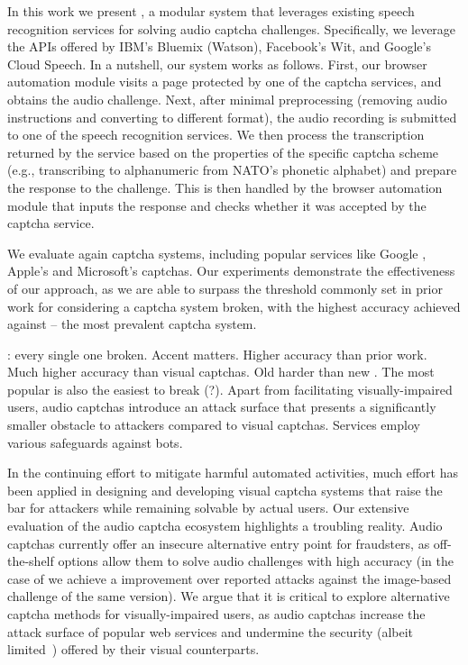 In this work we present \system, a modular system that leverages existing speech recognition services
for solving audio captcha challenges. Specifically, we leverage the
APIs offered by IBM's Bluemix (Watson), Facebook's Wit, and Google's Cloud Speech. In a nutshell, our system works as
follows. First, our browser automation module visits a page protected by one of the captcha services,
and obtains the audio challenge. Next, after minimal preprocessing (removing audio instructions and 
converting to different format), the audio recording is submitted 
to one of the speech recognition services. We then process the transcription returned by the service
based on the properties of the specific captcha scheme (e.g., transcribing to alphanumeric 
from NATO's phonetic alphabet) and prepare the response to the challenge. This is then handled by
the browser automation module that inputs the response and checks whether it was accepted by the captcha
service.

We evaluate \system again \no captcha systems, including popular services like Google \re,
Apple's and Microsoft's captchas. Our experiments demonstrate the effectiveness of our approach,
as we are able to  surpass the threshold commonly set in prior work for considering
a captcha system broken, with the highest accuracy achieved against \re -- the most prevalent 
captcha system.

: every single one broken. Accent matters. Higher accuracy than prior work. Much higher accuracy than
visual captchas. Old \re harder than new \re. The most popular is also the easiest to break (?).
Apart from facilitating visually-impaired users, audio captchas introduce an attack
surface that presents a significantly smaller obstacle to attackers compared to visual captchas.
Services employ various safeguards against bots.

In the continuing effort to mitigate harmful automated activities, much effort has been applied in 
designing and developing visual captcha systems that raise the bar for attackers while remaining 
solvable by actual users. Our extensive evaluation of the audio captcha ecosystem highlights
a troubling reality. Audio captchas currently offer an insecure alternative entry point for fraudsters,
as off-the-shelf options allow them to solve audio challenges with high accuracy (in the case of \re
we achieve a  improvement over reported attacks against the image-based challenge of the same version). 
We argue that it is critical to explore alternative captcha methods for visually-impaired users,
as audio captchas increase the attack surface of popular web services and undermine the security
(albeit limited~\cite{185128,sivakorn:eurosp16}) offered by their visual counterparts.

